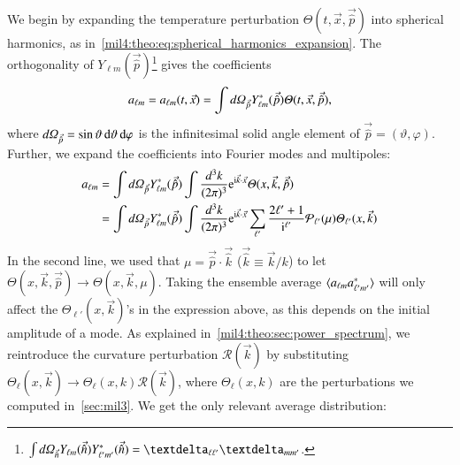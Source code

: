 We begin by expanding the temperature perturbation $\Theta(t, \vec{x}, \vec{\hat{p}})$ into spherical harmonics, as in~\cref{mil4:theo:eq:spherical_harmonics_expansion}.
The orthogonality of $Y_{\ell m}(\vec{\hat{p}})$\footnote{$\int \dOmg[n] Y\ellm(\vec{\hat{n}}) Y\ellmp^*(\vec{\hat{n}}) = \deltasym{\ell \ell'} \deltasym{m m'} $.} gives the coefficients
\begin{equation}
    a\ellm = a\ellm(t,\vec{x}) = \int \dOmg[p] Y^*_{\ell m} (\vec{\hat{p}}) \Theta(t, \vec{x}, \vec{\hat{p}}),
\end{equation}
where $d\varOmega_{\vec{\hat{p}}} = \sin{\vartheta} \diff \vartheta\diff \varphi$ is the infinitesimal solid angle element of $\vec{\hat{p}} = (\vartheta, \varphi)$. Further, we expand the coefficients into Fourier modes and multipoles:
\begin{equation}
\begin{split}
    a_{\ell m} &= \int \dOmg[p] Y^*_{\ell m} (\vec{\hat{p}}) \int \frac{d^3 k}{(2\pi)^3} \eu[\im \vec{k}\cdot \vec{x}] \Theta(x, \vec{k}, \vec{\hat{p}})  \\
    &= \int \dOmg[p] Y^*_{\ell m} (\vec{\hat{p}}) \int \frac{d^3 k}{(2\pi)^3} \eu[\im \vec{k}\cdot \vec{x}]\sum_{\ell'} \frac{2\ell' + 1}{\im^{\ell'}} \mathcal{P}_{\ell'}(\mu) \Theta_{\ell'}(x, \vec{k})
\end{split}
\end{equation}
In the second line, we used that $\mu=\vec{\hat{p}}\cdot\vec{\hat{k}}$ ($\vec{\hat{k}}\equiv \vec{k}/k$) to let $\Theta(x,\vec{k}, \vec{\hat{p}}) \to\Theta(x,\vec{k},\mu) $. Taking the ensemble average $\langle a\ellm a^*\ellmp \rangle$ will only affect the $\Theta_{\ell'}(x, \vec{k})$'s in the expression above, as this depends on the initial amplitude of a mode. As explained in~\cref{mil4:theo:sec:power_spectrum}, we reintroduce the curvature perturbation $\mathcal{R}(\vec{k})$ by substituting $\Theta_\ell(x,\vec{k}) \to \Theta_\ell(x,k) \mathcal{R}(\vec{k})$, where $\Theta_\ell(x, k)$ are the perturbations we computed in~\cref{sec:mil3}. We get the only relevant average distribution:

